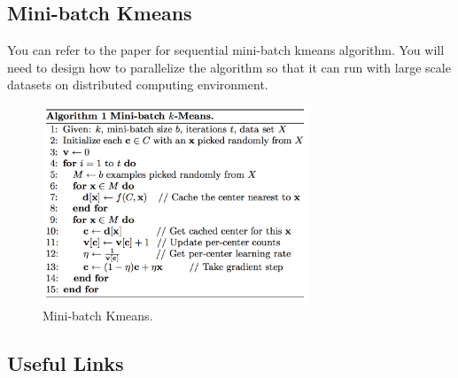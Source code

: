 \subsection*{Mini-batch Kmeans}
You can refer to the paper for sequential mini-batch
kmeans algorithm. You will need to design how to parallelize the algorithm so
that it can run with large scale datasets on distributed computing environment.

\begin{figure}[H]
\includegraphics[width=8cm]{section/icloud/assignment/problems/project8/mbkmeans}
\centering
\caption{Mini-batch Kmeans.}
\end{figure}  

\subsection*{Useful Links}
